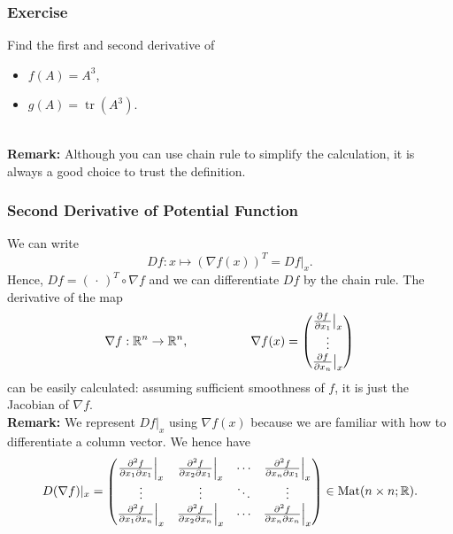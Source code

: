 \documentclass[10pt, t, allowdisplaybreaks]{beamer}
\newcommand{\nullspace}{~\\[15pt]}
\begin{document}
\begin{frame}
    \frametitle{Exercise}
    Find the first and second derivative of
    \begin{itemize}
        \item $f(A)=A^3$,
        \item $g(A)=\operatorname{tr}(A^3)$.
    \end{itemize}
    \nullspace
    \textbf{Remark:} Although you can use chain rule to simplify the calculation, it is always a good choice to trust the definition.
\end{frame}

\begin{frame}[allowframebreaks]
    \frametitle{Second Derivative of Potential Function}
    We can write
    \[Df:x\mapsto(\nabla f(x))^T=Df|_x.\]
    Hence, $Df=(\,\cdot\,)^T\circ\nabla f$ and we can dif{}ferentiate $Df$ by the chain rule. The derivative of the map
    \[\nabla f:\mathbb{R}^n\to\mathbb{R}^n,\qquad\qquad\quad
        \nabla f(x)=\begin{pmatrix}
            \frac{\partial f}{\partial x_1}\big|_x \\
            \vdots                                 \\
            \frac{\partial f}{\partial x_n}\big|_x
        \end{pmatrix}\]
    \vspace*{-1pt}
    can be easily calculated: assuming suf{}ficient smoothness of $f$, it is just the Jacobian of $\nabla f$.
    \nullspace
    \textbf{Remark:} We represent $Df|_x$ using $\nabla f(x)$ because we are familiar with how to differentiate a column vector.
    \newpage
    We hence have
    \begin{equation}\label{2.5.2}
        D(\nabla f)|_x=\begin{pmatrix}
            \frac{\partial^2 f}{\partial x_1\partial x_1}\Big|_x & \frac{\partial^2 f}{\partial x_2\partial x_1}\Big|_x & \cdots & \frac{\partial^2 f}{\partial x_n\partial x_1}\Big|_x \\
            \vdots                                               & \vdots                                               & \ddots & \vdots                                               \\
            \frac{\partial^2 f}{\partial x_1\partial x_n}\Big|_x & \frac{\partial^2 f}{\partial x_2\partial x_n}\Big|_x & \cdots & \frac{\partial^2 f}{\partial x_n\partial x_n}\Big|_x
        \end{pmatrix}\in\text{Mat}(n\times n;\mathbb{R}).
    \end{equation}

\end{frame}
\end{document}
